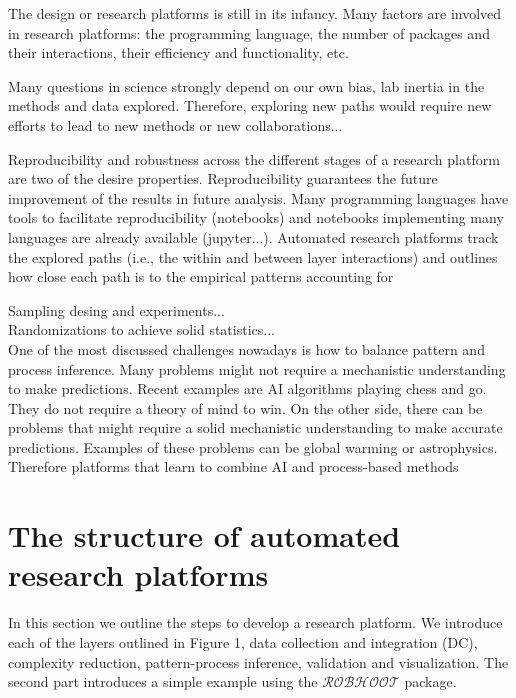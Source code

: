 \documentclass[english,12pt]{article}
\begin{document}
The design or research platforms is still in its infancy. Many factors
are involved in research platforms: the programming language, the
number of packages and their interactions, their efficiency and
functionality, etc.


Many questions in science strongly depend on our own bias, lab inertia
in the methods and data explored. Therefore, exploring new paths would
require new efforts to lead to new methods or new collaborations...

Reproducibility and robustness across the different stages of a
research platform are two of the desire properties. Reproducibility
guarantees the future improvement of the results in future
analysis. Many programming languages have tools to facilitate
reproducibility (notebooks) and notebooks implementing many languages
are already available (jupyter...). Automated research platforms track
the explored paths (i.e., the within and between layer interactions)
and outlines how close each path is to the empirical patterns
accounting for

Sampling desing and experiments...\\

Randomizations to achieve solid statistics...\\

One of the most discussed challenges nowadays is how to balance
pattern and process inference. Many problems might not require a
mechanistic understanding to make predictions. Recent examples are AI
algorithms playing chess and go. They do not require a theory of mind
to win. On the other side, there can be problems that might require a
solid mechanistic understanding to make accurate predictions. Examples
of these problems can be global warming or astrophysics. Therefore
platforms that learn to combine AI and process-based methods



\section{The structure of automated research platforms}
In this section we outline the steps to develop a research
platform. We introduce each of the layers outlined in Figure 1, data
collection and integration (DC), complexity reduction, pattern-process
inference, validation and visualization. The second part introduces a
simple example using the $\mathcal{ROBHOOT}$ package.
\end{document}
